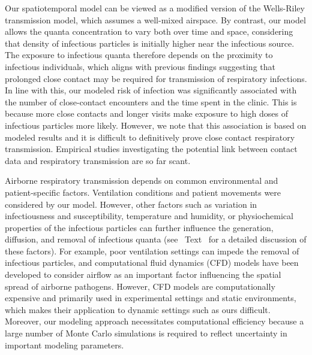 \documentclass[fleqn,11pt]{wlscirep}
\begin{document}
Our spatiotemporal model can be viewed as a modified version of the Wells-Riley transmission model\cite{Riley1978AJE}, which assumes a well-mixed airspace. By contrast, our model allows the quanta concentration to vary both over time and space, considering that density of infectious particles is initially higher near the infectious source\cite{Wang2021Science,Vuorinen2020SafSci,Chen2020BuildEnv}. The exposure to infectious quanta therefore depends on the proximity to infectious individuals, which aligns with previous findings suggesting that prolonged close contact may be required for transmission of respiratory infections\cite{Leung2020NatMed,Brankston2007LancetID,Narasimhan2013PulmonaryMed}. In line with this, our modeled risk of infection was significantly associated with the number of close-contact encounters and the time spent in the clinic. This is because more close contacts and longer visits make exposure to high doses of infectious particles more likely. However, we note that this association is based on modeled results and it is difficult to definitively prove close contact respiratory transmission. Empirical studies investigating the potential link between contact data and respiratory transmission are so far scant\cite{Voirin2015ICHE,Vanhems2013PONE}.

Airborne respiratory transmission depends on common environmental and patient-specific factors.  Ventilation conditions and patient movements were considered by our model. However, other factors such as variation in infectiousness and susceptibility, temperature and humidity, or physiochemical properties of the infectious particles can further influence the generation, diffusion, and removal of infectious quanta (see \supp~Text~ for a detailed discussion of these factors). For example, poor ventilation settings can impede the removal of infectious particles\cite{Li2021BuildEnv}, and computational fluid dynamics (CFD) models have been developed to consider airflow as an important factor influencing the spatial spread of airborne pathogens\cite{Vuorinen2020SafSci,Jung2021InfectChemo,Li2021BuildEnv,Yan2023BE,Qian2009BE,Li2022SOTTE}. However, CFD models are computationally expensive and primarily used in experimental settings and static environments, which makes their application to dynamic settings such as ours difficult. Moreover, our modeling approach necessitates computational efficiency because a large number of Monte Carlo simulations is required to reflect uncertainty in important modeling parameters. 
\end{document}
